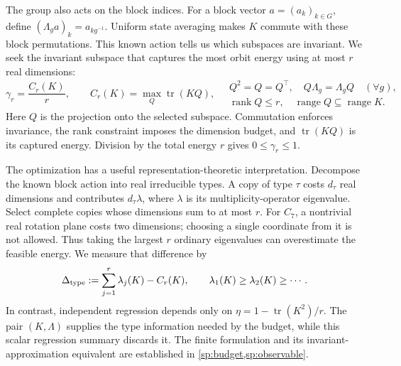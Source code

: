 The group also acts on the block indices. For a block vector $a=(a_k)_{k\in G}$, define $(\Lambda_g a)_k=a_{kg^{-1}}$. Uniform state averaging makes $K$ commute with these block permutations. This known action tells us which subspaces are invariant. We seek the invariant subspace that captures the most orbit energy using at most $r$ real dimensions:
\begin{equation}
 \gamma_r=\frac{C_r(K)}r,\qquad
 C_r(K)=\max_Q\operatorname{tr}(KQ),\quad
 \begin{gathered}
 Q^2=Q=Q^\top,\quad Q\Lambda_g=\Lambda_gQ\quad(\forall g),\\
 \operatorname{rank}Q\le r,\quad\operatorname{range}Q\subseteq\operatorname{range}K.
 \end{gathered}
 \label{eq:budget-main}
\end{equation}
Here $Q$ is the projection onto the selected subspace. Commutation enforces invariance, the rank constraint imposes the dimension budget, and $\operatorname{tr}(KQ)$ is its captured energy. Division by the total energy $r$ gives $0\le\gamma_r\le1$.

The optimization has a useful representation-theoretic interpretation. Decompose the known block action into real irreducible types. A copy of type $\tau$ costs $d_\tau$ real dimensions and contributes $d_\tau\lambda$, where $\lambda$ is its multiplicity-operator eigenvalue. Select complete copies whose dimensions sum to at most $r$. For $C_7$, a nontrivial real rotation plane costs two dimensions; choosing a single coordinate from it is not allowed. Thus taking the largest $r$ ordinary eigenvalues can overestimate the feasible energy. We measure that difference by
\[
 \Delta_{\rm type}:=\sum_{j=1}^{r}\lambda_j(K)-C_r(K),
 \qquad \lambda_1(K)\ge\lambda_2(K)\ge\cdots.
\]
In contrast, independent regression depends only on $\eta=1-\operatorname{tr}(K^2)/r$. The pair $(K,\Lambda)$ supplies the type information needed by the budget, while this scalar regression summary discards it. The finite formulation and its invariant-approximation equivalent are established in \cref{sp:budget,sp:observable}.

